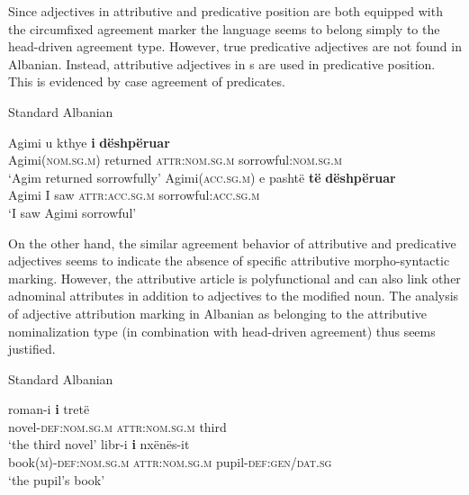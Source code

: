 Since adjectives in attributive and predicative position are both equipped with the circumfixed agreement marker the language seems to belong simply to the head\hyp{}driven agreement type. However, true predicative adjectives are not found in Albanian. Instead, attributive adjectives in s are used in predicative position. This is evidenced by case agreement of predicates.
\begin{exe}
\ex \rm{Standard Albanian \citep{demiraj1998}}
\begin{xlist}
\ex
\gll	Agimi {u kthye} \textbf{i} \textbf{dëshpëruar}\\
	Agimi(\textsc{nom.sg.m}) returned \textsc{attr:nom.sg.m} sorrowful:\textsc{nom.sg.m}\\
\glt	‘Agim returned sorrowfully’
\ex
\gll	Agimi(\textsc{acc.sg.m}) e pashtë \textbf{të} \textbf{dëshpëruar}\\
	Agimi I saw \textsc{attr:acc.sg.m} sorrowful:\textsc{acc.sg.m}\\
\glt	‘I saw Agimi sorrowful’
\end{xlist}
\end{exe}
On the other hand, the similar agreement behavior of attributive and predicative adjectives seems to indicate the absence of specific attributive morpho-syntactic marking. However, the attributive article is polyfunctional and can also link other adnominal attributes in addition to adjectives to the modified noun. The analysis of adjective attribution marking in Albanian as belonging to the attributive nominalization type (in combination with head\hyp{}driven agreement) thus seems justified.
\begin{exe}
\ex \rm{Standard Albanian \citep{demiraj1998}}
\begin{xlist}
\ex
\gll	roman-i 			\textbf{i} 			tretë\\
	novel-\textsc{def:nom.sg.m} \textsc{attr:nom.sg.m} third\\
\glt	‘the third novel’
\ex	
\gll	libr-i 	\textbf{i} nxënës-it\\
	book(\textsc{m})-\textsc{def:nom.sg.m} \textsc{attr:nom.sg.m} pupil-\textsc{def:gen/dat.sg}\\
\glt	‘the pupil's book’
\end{xlist}
\end{exe}

